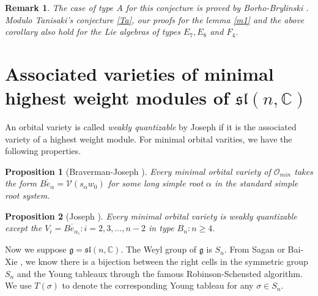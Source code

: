 \documentclass{amsart}[12pt]
\newtheorem{Pro}{Proposition}[section]
\newtheorem{Rem}{Remark}[section]
\numberwithin{equation}{section}
\begin{document}
\begin{Rem}The case of type $A$ for this conjecture is proved by Borho-Brylinski \cite{BoB3}. Modulo Tanisaki's conjecture \ref{Ta}, our proofs for the lemma \ref{m1} and the above corollary  also hold for the Lie algebras of types $E_7, E_8$ and $F_4$.


\end{Rem}



\section{ Associated varieties of minimal highest weight modules of $\mathfrak{sl}(n, \mathbb{C})$ }

An orbital variety is called {\it weakly quantizable} by Joseph\cite{Jo98} if it is the associated variety of a highest weight module. For minimal orbital varities, we have the following properties.




	\begin{Pro}[Braverman-Joseph \cite{BJ}]\label{JB}
	Every minimal orbital variety of $\mathcal{O}_{min}$ takes the form $\overline{Be_{\alpha}}=\mathcal{V}(s_{\alpha}w_0)$ for some long simple root $\alpha$ in the standard simple root system.
\end{Pro}

\begin{Pro}[Joseph \cite{Jo98}]
	Every minimal orbital variety is weakly quantizable except the $V_i=\overline{Be_{\alpha_i}}: i=2,3,...,n-2$ in type $B_n: n\geq 4$.
\end{Pro}







Now we suppose  $\mathfrak{g}=\mathfrak{sl}(n, \mathbb{C})$.
The Weyl group of $\mathfrak{g}$ is  $S_n$. From Sagan \cite{Sa} or Bai-Xie \cite[Lemma 4.1]{BX}, we know there is a bijection between the right cells in the symmetric group $S_n$ and the Young tableaux through the famous Robinson-Schensted algorithm.
We use $T(\sigma)$ to denote the corresponding Young tableau for any $\sigma \in S_n$.
\end{document}
